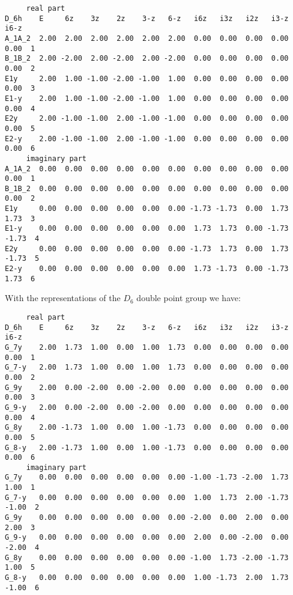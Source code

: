 \documentclass[12pt,a4paper,twoside]{report}
\begin{document}
\begin{tcolorbox}
\begin{scriptsize}
\begin{verbatim}
     real part
D_6h    E     6z    3z    2z    3-z   6-z   i6z   i3z   i2z   i3-z   i6-z
A_1A_2  2.00  2.00  2.00  2.00  2.00  2.00  0.00  0.00  0.00  0.00   0.00  1
B_1B_2  2.00 -2.00  2.00 -2.00  2.00 -2.00  0.00  0.00  0.00  0.00   0.00  2
E1y     2.00  1.00 -1.00 -2.00 -1.00  1.00  0.00  0.00  0.00  0.00   0.00  3
E1-y    2.00  1.00 -1.00 -2.00 -1.00  1.00  0.00  0.00  0.00  0.00   0.00  4
E2y     2.00 -1.00 -1.00  2.00 -1.00 -1.00  0.00  0.00  0.00  0.00   0.00  5
E2-y    2.00 -1.00 -1.00  2.00 -1.00 -1.00  0.00  0.00  0.00  0.00   0.00  6
     imaginary part
A_1A_2  0.00  0.00  0.00  0.00  0.00  0.00  0.00  0.00  0.00  0.00   0.00  1
B_1B_2  0.00  0.00  0.00  0.00  0.00  0.00  0.00  0.00  0.00  0.00   0.00  2
E1y     0.00  0.00  0.00  0.00  0.00  0.00 -1.73 -1.73  0.00  1.73   1.73  3
E1-y    0.00  0.00  0.00  0.00  0.00  0.00  1.73  1.73  0.00 -1.73  -1.73  4
E2y     0.00  0.00  0.00  0.00  0.00  0.00 -1.73  1.73  0.00  1.73  -1.73  5
E2-y    0.00  0.00  0.00  0.00  0.00  0.00  1.73 -1.73  0.00 -1.73   1.73  6
\end{verbatim}
\end{scriptsize}
\end{tcolorbox}


With the representations of the $D_6$ double point group we have:

\begin{tcolorbox}
\begin{scriptsize}
\begin{verbatim}
     real part
D_6h    E     6z    3z    2z    3-z   6-z   i6z   i3z   i2z   i3-z   i6-z
G_7y    2.00  1.73  1.00  0.00  1.00  1.73  0.00  0.00  0.00  0.00   0.00  1
G_7-y   2.00  1.73  1.00  0.00  1.00  1.73  0.00  0.00  0.00  0.00   0.00  2
G_9y    2.00  0.00 -2.00  0.00 -2.00  0.00  0.00  0.00  0.00  0.00   0.00  3
G_9-y   2.00  0.00 -2.00  0.00 -2.00  0.00  0.00  0.00  0.00  0.00   0.00  4
G_8y    2.00 -1.73  1.00  0.00  1.00 -1.73  0.00  0.00  0.00  0.00   0.00  5
G_8-y   2.00 -1.73  1.00  0.00  1.00 -1.73  0.00  0.00  0.00  0.00   0.00  6
     imaginary part
G_7y    0.00  0.00  0.00  0.00  0.00  0.00 -1.00 -1.73 -2.00  1.73   1.00  1
G_7-y   0.00  0.00  0.00  0.00  0.00  0.00  1.00  1.73  2.00 -1.73  -1.00  2
G_9y    0.00  0.00  0.00  0.00  0.00  0.00 -2.00  0.00  2.00  0.00   2.00  3
G_9-y   0.00  0.00  0.00  0.00  0.00  0.00  2.00  0.00 -2.00  0.00  -2.00  4
G_8y    0.00  0.00  0.00  0.00  0.00  0.00 -1.00  1.73 -2.00 -1.73   1.00  5
G_8-y   0.00  0.00  0.00  0.00  0.00  0.00  1.00 -1.73  2.00  1.73  -1.00  6
\end{verbatim}
\end{scriptsize}
\end{tcolorbox}
\end{document}
